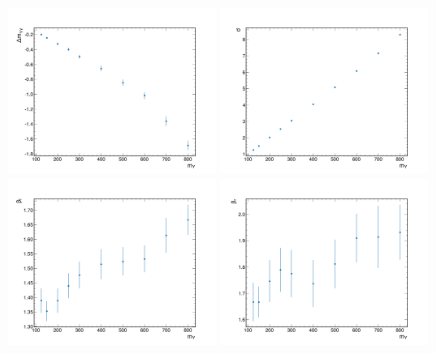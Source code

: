 \begin{figure}
  \centering
  \includegraphics[width=0.49\textwidth]{Figures/Dihiggs/signal/shape_change/y_gg_high_mass_my_dm.pdf}
  \includegraphics[width=0.49\textwidth]{Figures/Dihiggs/signal/shape_change/y_gg_high_mass_my_sigma.pdf} \\
  \includegraphics[width=0.49\textwidth]{Figures/Dihiggs/signal/shape_change/y_gg_high_mass_my_bl.pdf}
  \includegraphics[width=0.49\textwidth]{Figures/Dihiggs/signal/shape_change/y_gg_high_mass_my_br.pdf} \\

\end{figure}
